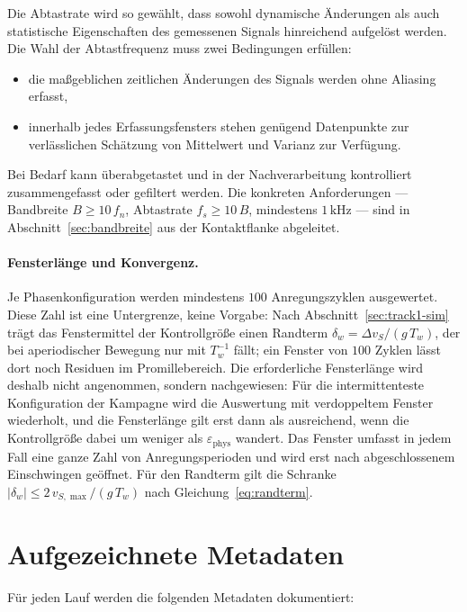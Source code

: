 \documentclass[12pt,a4paper]{report}
\begin{document}
Die Abtastrate wird so gewählt, dass sowohl dynamische Änderungen als
auch statistische Eigenschaften des gemessenen Signals hinreichend
aufgelöst werden. Die Wahl der Abtastfrequenz muss zwei Bedingungen
erfüllen:

\begin{itemize}
\item die maßgeblichen zeitlichen Änderungen des Signals werden ohne
      Aliasing erfasst,
\item innerhalb jedes Erfassungsfensters stehen genügend Datenpunkte zur
      verlässlichen Schätzung von Mittelwert und Varianz zur Verfügung.
\end{itemize}

Bei Bedarf kann überabgetastet und in der Nachverarbeitung kontrolliert
zusammengefasst oder gefiltert werden. Die konkreten Anforderungen ---
Bandbreite $B \geq 10\,f_n$, Abtastrate $f_s \geq 10\,B$, mindestens
$1\,\mathrm{kHz}$ --- sind in Abschnitt~\ref{sec:bandbreite} aus der
Kontaktflanke abgeleitet.

\paragraph{Fensterlänge und Konvergenz.}
Je Phasenkonfiguration werden mindestens $100$ Anregungszyklen
ausgewertet. Diese Zahl ist eine Untergrenze, keine Vorgabe: Nach
Abschnitt~\ref{sec:track1-sim} trägt das Fenstermittel der Kontrollgröße
einen Randterm $\delta_w = \Delta v_S/(g\,T_w)$, der bei aperiodischer
Bewegung nur mit $T_w^{-1}$ fällt; ein Fenster von $100$ Zyklen lässt dort
noch Residuen im Promillebereich. Die
erforderliche Fensterlänge wird deshalb nicht angenommen, sondern
nachgewiesen: Für die intermittenteste Konfiguration der Kampagne wird
die Auswertung mit verdoppeltem Fenster wiederholt, und die Fensterlänge
gilt erst dann als ausreichend, wenn die Kontrollgröße dabei um weniger
als $\varepsilon_{\mathrm{phys}}$ wandert. Das Fenster umfasst in jedem Fall eine ganze Zahl von Anregungsperioden
und wird erst nach abgeschlossenem Einschwingen geöffnet. Für den
Randterm gilt die Schranke $|\delta_w| \le 2\,v_{S,\max}/(g\,T_w)$ nach
Gleichung~\eqref{eq:randterm}.

\section{Aufgezeichnete Metadaten}

Für jeden Lauf werden die folgenden Metadaten dokumentiert:
\end{document}
